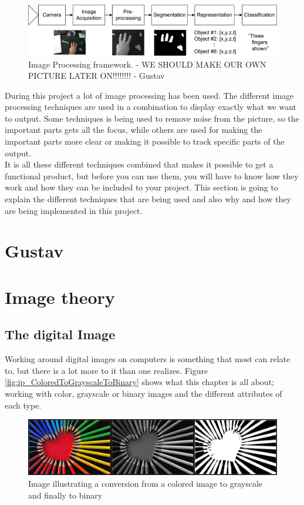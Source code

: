 \begin{figure}[htbp]
\centering
\includegraphics[width=1.00\textwidth]{Pictures/Theory/imageProcessing_steps.png}
\caption{Image Processing framework. - WE SHOULD MAKE OUR OWN PICTURE LATER ON!!!!!!!! - Gustav}
\label{fig:ip_framework}
\end{figure}

During this project a lot of image processing has been used. The different image processing techniques are used in a combination to display exactly what we want to output. Some techniques is being used to remove noise from the picture, so the important parts gets all the focus, while others are used for making the important parts more clear or making it possible to track specific parts of the output. \\
It is all these different techniques combined that makes it possible to get a functional product, but before you can use them, you will have to know how they work and how they can be included to your project. This section is going to explain the different techniques that are being used and also why and how they are being implemented in this project.

\chapter{Gustav}

\chapter{Image theory}
\section{The digital Image}
Working around digital images on computers is something that most can relate to, but there is a lot more to it than one realizes. Figure \eqref{fig:ip_ColoredToGrayscaleToBinary} shows what this chapter is all about; working with color, grayscale or binary images and the different attributes of each type.

\begin{figure}[htbp]
\centering
\includegraphics[width=1.00\textwidth]{Pictures/Theory/ColoredToGrayscaleToBinary.jpg}
\caption{Image illustrating a conversion from a colored image to grayscale and finally to binary}
\label{fig:ip_ColoredToGrayscaleToBinary}
\end{figure}

